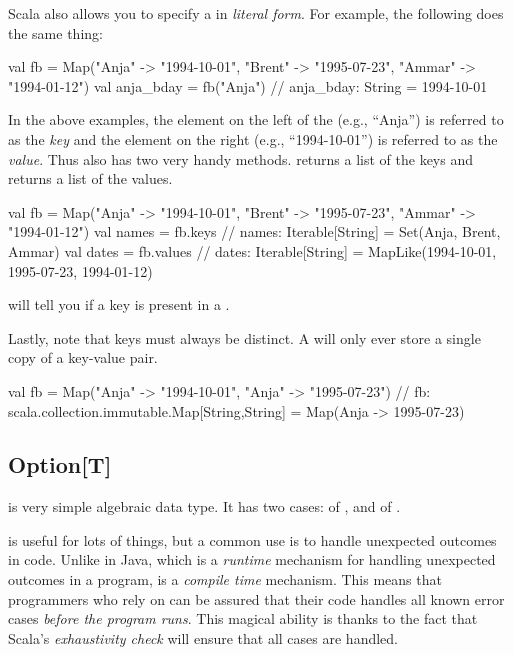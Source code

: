 \documentclass[9pt]{extbook}
\begin{document}
Scala also allows you to specify a  in \emph{literal form}.  For example, the following does the same thing:

\begin{scalacode}
val fb = Map("Anja" -> "1994-10-01", "Brent" -> "1995-07-23", "Ammar" -> "1994-01-12")
val anja_bday = fb("Anja")
// anja_bday: String = 1994-10-01
\end{scalacode}

In the above examples, the element on the left of the \scalainline{->} (e.g., ``Anja'') is referred to as the \emph{key} and the element on the right (e.g., ``1994-10-01'') is referred to as the \emph{value}.  Thus  also has two very handy methods.   returns a list of the keys and  returns a list of the values.

\begin{scalacode}
val fb = Map("Anja" -> "1994-10-01", "Brent" -> "1995-07-23", "Ammar" -> "1994-01-12")
val names = fb.keys
// names: Iterable[String] = Set(Anja, Brent, Ammar)
val dates = fb.values
// dates: Iterable[String] = MapLike(1994-10-01, 1995-07-23, 1994-01-12)
\end{scalacode}

 will tell you if a key is present in a .

Lastly, note that keys must always be distinct.  A  will only ever store a single copy of a key-value pair.

\begin{scalacode}
val fb = Map("Anja" -> "1994-10-01", "Anja" -> "1995-07-23")
// fb: scala.collection.immutable.Map[String,String] = Map(Anja -> 1995-07-23)
\end{scalacode}


\subsection{Option[T]}

 is very simple algebraic data type.  It has two cases:  of , and  of .

 is useful for lots of things, but a common use is to handle unexpected outcomes in code.  Unlike  in Java, which is a \emph{runtime} mechanism for handling unexpected outcomes in a program,  is a \emph{compile time} mechanism.  This means that programmers who rely on  can be assured that their code handles all known error cases \emph{before the program runs}.  This magical ability is thanks to the fact that Scala's \emph{exhaustivity check} will ensure that all cases are handled.
\end{document}
